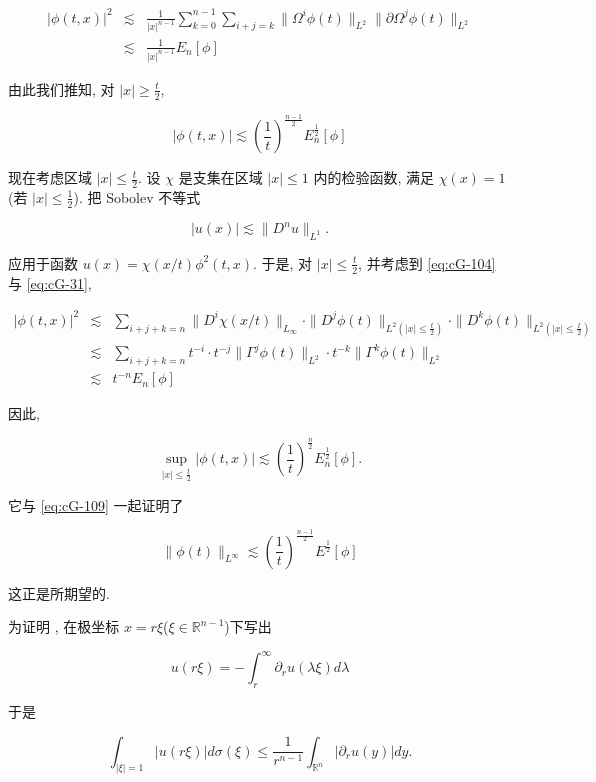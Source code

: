 \[
\begin{array}{rcl}
|\phi(t,  x)|^{2} & \lesssim & \frac{1}{|x|^{n - 1}}\sum_{k = 0}^{n - 1}\sum_{i + j = k}\|\Omega^{i}\phi(t)\|_{L^{2}}\|\partial\Omega^{j}\phi(t)\|_{L^{2}} \\
& \lesssim & \frac{1}{|x|^{n - 1}}E_{n}[\phi]
\end{array}
\]

由此我们推知, 对 $|x| \geq \frac{t}{2}$, 

\begin{equation}
|\phi(t,  x)| \lesssim \left(\frac{1}{t}\right)^{\frac{n - 1}{2}}E_{n}^{\frac{1}{2}}[\phi]\label{eq:cG-109}
\end{equation}

现在考虑区域 $|x| \leq \frac{t}{2}$. 设 $\chi$ 是支集在区域 $|x| \leq 1$ 内的检验函数, 满足 $\chi(x) = 1$(若 $|x| \leq \frac{1}{2}$). 把 Sobolev 不等式

\[
|u(x)| \lesssim \|D^{n}u\|_{L^{1}}.
\]

应用于函数 $u(x) = \chi(x/t)\phi^{2}(t,  x)$. 于是, 对 $|x| \leq \frac{t}{2}$, 并考虑到 \eqref{eq:cG-104} 与 \eqref{eq:cG-31}, 

\[
\begin{array}{rcl}
|\phi(t,  x)|^{2} & \lesssim & \sum_{i + j + k = n}\|D^{i}\chi(x/t)\|_{L_{\infty}}\cdot\|D^{j}\phi(t)\|_{L^{2}(|x| \leq \frac{t}{2})}\cdot\|D^{k}\phi(t)\|_{L^{2}(|x| \leq \frac{t}{2})} \\
& \lesssim & \sum_{i + j + k = n}t^{-i}\cdot t^{-j}\|\Gamma^{j}\phi(t)\|_{L^{2}}\cdot t^{-k}\|\Gamma^{k}\phi(t)\|_{L^{2}} \\
& \lesssim & t^{-n}E_{n}[\phi]
\end{array}
\]

因此, 

\[
\sup_{|x| \leq \frac{t}{2}}|\phi(t,  x)| \lesssim \left(\frac{1}{t}\right)^{\frac{n}{2}}E_{n}^{\frac{1}{2}}[\phi].
\]

它与 \eqref{eq:cG-109} 一起证明了

\[
\|\phi(t)\|_{L^{\infty}} \lesssim \left(\frac{1}{t}\right)^{\frac{n - 1}{2}}E^{\frac{1}{2}}[\phi]
\]

这正是所期望的. 

为证明 , 在极坐标 $x = r\xi$($\xi \in \mathbb{R}^{n - 1}$)下写出

\[
u(r\xi) = -\int_{r}^{\infty}\partial_{r}u(\lambda\xi)d\lambda
\]

于是

\[
\int_{|\xi| = 1}|u(r\xi)|d\sigma(\xi) \leq \frac{1}{r^{n - 1}}\int_{\mathbb{R}^{n}}|\partial_{r}u(y)|dy.
\]

